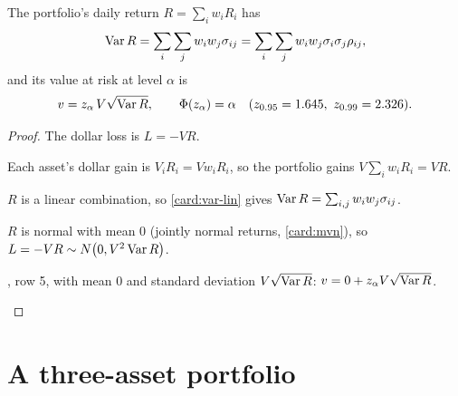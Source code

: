 \begin{result}
\label{res:pvar}
The portfolio's daily return $R=\sum_iw_iR_i$ has
\[
  \operatorname{Var} R=\sum_i\sum_jw_iw_j\sigma_{ij}=\sum_i\sum_jw_iw_j\sigma_i\sigma_j\rho_{ij},
\]
and its value at risk at level $\alpha$ is
\[
  v=z_\alpha\,V\sqrt{\Var R},\qquad\Phi(z_\alpha)=\alpha\quad(z_{0.95}=1.645,\ z_{0.99}=2.326).
\]
\end{result}
\begin{proof}
The dollar loss is $L=-VR$.
\begin{steps}
  \item Each asset's dollar gain is $V_iR_i=Vw_iR_i$, so the portfolio gains $V\sum_iw_iR_i=VR$.
  \item $R$ is a linear combination, so \cref{card:var-lin} gives $\operatorname{Var} R=\sum_{i,j}w_iw_j\sigma_{ij}$.
  \item $R$ is normal with mean $0$ (jointly normal returns, \cref{card:mvn}), so $L=-VR\sim N\big(0,V^2\operatorname{Var} R\big)$.
  \item {}, row 5, with mean $0$ and standard deviation $V\sqrt{\operatorname{Var} R}$: $v=0+z_\alpha V\sqrt{\operatorname{Var} R}$. \qedhere
\end{steps}
\end{proof}

\section{A three-asset portfolio}

